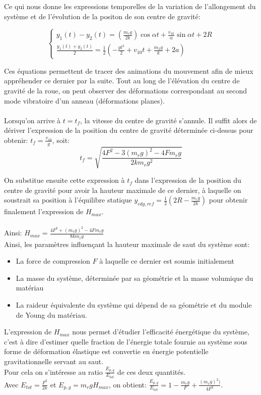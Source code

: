 Ce qui nous donne les expressions temporelles de la variation de l'allongement du système et de l'évolution de la positon de son centre de gravité:

\begin{equation}
  \begin{cases}
    y_1(t)-y_2(t)= (\frac{m_r g}{2k})\cos{\alpha t}+\frac{v_{10}}{\alpha}\sin{\alpha t}+2R\\
    \frac{y_1(t)+y_2(t)}{2}=\frac{1}{2}(-\frac{g t^2}{2}+v_{10}t+\frac{m_2 g}{k} +2a)
  \end{cases}
  \label{eq:6}
\end{equation}

Ces équations permettent de tracer des animations du mouvement afin de mieux appréhender ce dernier par la suite. Tout au long de l'élévation du centre de gravité de la roue, on peut observer des déformations correspondant au second mode vibratoire d'un anneau (déformations planes).
\\ 
\\


Lorsqu'on arrive à $t=t_f$, la vitesse du centre de gravité s'annule. Il suffit alors de dériver l'expression de la position du centre de gravité déterminée ci-dessus pour obtenir: $t_f=\frac{v_{10}}{g}$, soit: 
$$ t_f=\sqrt{\frac{4F^2 -3(m_r g)^2-4Fm_rg}{2 k m_r g^2}}$$

On substitue ensuite cette expression à $t_f$ dans l'expression de la position du centre de gravité pour avoir la hauteur maximale de ce dernier, à laquelle on soustrait sa position à l'équilibre statique $y_{cdg,ref}=\frac{1}{2}(2R-\frac{m_r g}{2k})$ pour obtenir finalement l'expression de $H_{max}$.
\\ \\
Ainsi: $H_{max}=\frac{4F^2+(m_rg)^2-4Fm_rg}{8km_rg}$
\\

Ainsi, les paramètres influençant la hauteur maximale de saut du système sont:
\begin{itemize}
    \item La force de compression $F$ à laquelle ce dernier est soumis initialement
    \item La masse du système, déterminée par sa géométrie et la masse volumique du matériau
    \item La raideur équivalente du système qui dépend de sa géométrie et du module de Young du matériau.
\end{itemize}

L'expression de $H_{max}$ nous permet d'étudier l'efficacité énergétique du système, c'est à dire d'estimer quelle fraction de l'énergie totale fournie au système sous forme de déformation élastique est convertie en énergie potentielle gravitationnelle servant au saut. \\
Pour cela on s'intéresse au ratio $\frac{E_{p,g}}{E_{tot}}$ de ces deux quantités. \\
Avec $E_{tot}=\frac{F^2}{2k}$ et $E_{p,g}=m_r g H_{max}$, on obtient:  $\frac{E_{p,g}}{E_{tot}}=1-\frac{m_rg}{F}+\frac{(m_r g)^2)}{4F^2}$.

